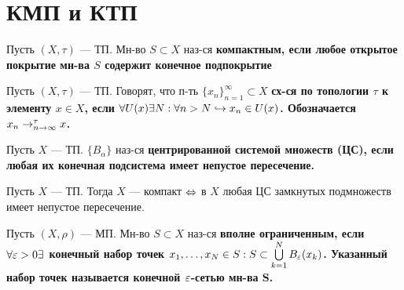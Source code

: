 \section{КМП и КТП}

\begin{defn}
Пусть $(X, \tau)$ --- ТП. Мн-во $S \subset X$ наз-ся \bf{компактным}, если любое открытое покрытие мн-ва $S$ содержит конечное подпокрытие
\end{defn}

\begin{defn}
Пусть $(X, \tau)$ --- ТП. Говорят, что п-ть $\{x_n\}_{n=1}^\infty \subset X$ \bf{сх-ся по топологии $\tau$} к элементу $x \in X$, если $\forall U(x) \exists N: \forall n > N \hookrightarrow x_n \in U(x)$. Обозначается $x_n \rightarrow_{n \rightarrow \infty}^\tau x$.
\end{defn}


\begin{defn}
Пусть $X$ --- ТП. $\{B_\alpha\}$ наз-ся \bf{центрированной системой множеств (ЦС)}, если любая их конечная подсистема имеет непустое пересечение.
\end{defn}

\begin{thm}
Пусть $X$ --- ТП. Тогда $X$ --- компакт $\Leftrightarrow$ в $X$ любая ЦС замкнутых подмножеств имеет непустое пересечение.
\end{thm}

\begin{defn}
Пусть $(X, \rho)$ --- МП. Мн-во $S \subset X$ наз-ся \bf{вполне ограниченным}, если $\forall \varepsilon > 0 \exists$ конечный набор точек $x_1, \dots, x_N \in S: S \subset \bigcup\limits_{k=1}^N B_\varepsilon(x_k)$. Указанный набор точек называется \bf{конечной $\varepsilon$-сетью} мн-ва S.
\end{defn}

